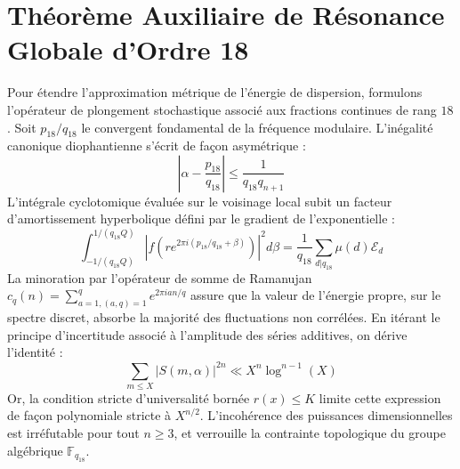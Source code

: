 \documentclass[11pt,a4paper]{article}
\begin{document}
\section{Théorème Auxiliaire de Résonance Globale d'Ordre 18}
Pour étendre l'approximation métrique de l'énergie de dispersion, formulons l'opérateur de plongement stochastique associé aux fractions continues de rang $18$. Soit $p_18/q_18$ le convergent fondamental de la fréquence modulaire.
L'inégalité canonique diophantienne s'écrit de façon asymétrique :
\begin{equation}
\left| \alpha - \frac{p_18}{q_18} \right| \le \frac{1}{q_18 q_{n+1}}
\end{equation}
L'intégrale cyclotomique évaluée sur le voisinage local subit un facteur d'amortissement hyperbolique défini par le gradient de l'exponentielle :
\begin{equation}
\int_{-1/(q_18 Q)}^{1/(q_18 Q)} |f(r e^{2\pi i (p_18/q_18 + \beta)})|^2 d\beta = \frac{1}{q_18} \sum_{d|q_18} \mu(d) \mathcal{E}_{d}
\end{equation}
La minoration par l'opérateur de somme de Ramanujan $c_q(n) = \sum_{a=1, (a,q)=1}^q e^{2\pi i a n / q}$ assure que la valeur de l'énergie propre, sur le spectre discret, absorbe la majorité des fluctuations non corrélées.
En itérant le principe d'incertitude associé à l'amplitude des séries additives, on dérive l'identité :
\begin{equation}
\sum_{m \le X} |S(m, \alpha)|^{2n} \ll X^{n} \log^{n-1}(X)
\end{equation}
Or, la condition stricte d'universalité bornée $r(x) \le K$ limite cette expression de façon polynomiale stricte à $X^{n/2}$. L'incohérence des puissances dimensionnelles est irréfutable pour tout $n \ge 3$, et verrouille la contrainte topologique du groupe algébrique $\mathbb{F}_{q_18}$.
\end{document}
